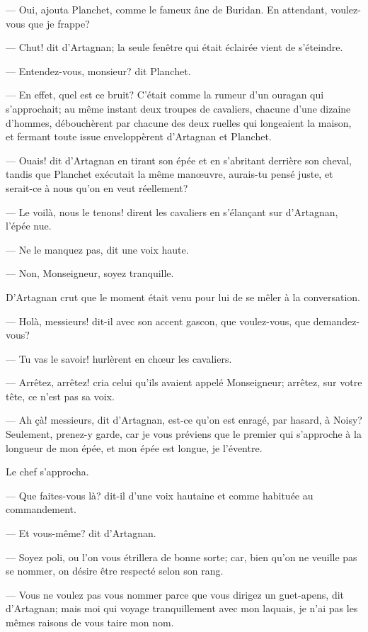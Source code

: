 — Oui, ajouta Planchet, comme le fameux âne de Buridan. En attendant, voulez-vous que je frappe?

— Chut! dit d'Artagnan; la seule fenêtre qui était éclairée vient de s'éteindre.

— Entendez-vous, monsieur? dit Planchet.

— En effet, quel est ce bruit? C'était comme la rumeur d'un ouragan qui s'approchait; au même instant deux troupes de cavaliers, chacune d'une dizaine d'hommes, débouchèrent par chacune des deux ruelles qui longeaient la maison, et fermant toute issue enveloppèrent d'Artagnan et Planchet.

— Ouais! dit d'Artagnan en tirant son épée et en s'abritant derrière son cheval, tandis que Planchet exécutait la même manœuvre, aurais-tu pensé juste, et serait-ce à nous qu'on en veut réellement?

— Le voilà, nous le tenons! dirent les cavaliers en s'élançant sur d'Artagnan, l'épée nue.

— Ne le manquez pas, dit une voix haute.

— Non, Monseigneur, soyez tranquille.

D'Artagnan crut que le moment était venu pour lui de se mêler à la conversation.

— Holà, messieurs! dit-il avec son accent gascon, que voulez-vous, que demandez-vous?

— Tu vas le savoir! hurlèrent en chœur les cavaliers.

— Arrêtez, arrêtez! cria celui qu'ils avaient appelé Monseigneur; arrêtez, sur votre tête, ce n'est pas sa voix.

— Ah çà! messieurs, dit d'Artagnan, est-ce qu'on est enragé, par hasard, à Noisy? Seulement, prenez-y garde, car je vous préviens que le premier qui s'approche à la longueur de mon épée, et mon épée est longue, je l'éventre.

Le chef s'approcha.

— Que faites-vous là? dit-il d'une voix hautaine et comme habituée au commandement.

— Et vous-même? dit d'Artagnan.

— Soyez poli, ou l'on vous étrillera de bonne sorte; car, bien qu'on ne veuille pas se nommer, on désire être respecté selon son rang.

— Vous ne voulez pas vous nommer parce que vous dirigez un guet-apens, dit d'Artagnan; mais moi qui voyage tranquillement avec mon laquais, je n'ai pas les mêmes raisons de vous taire mon nom.

